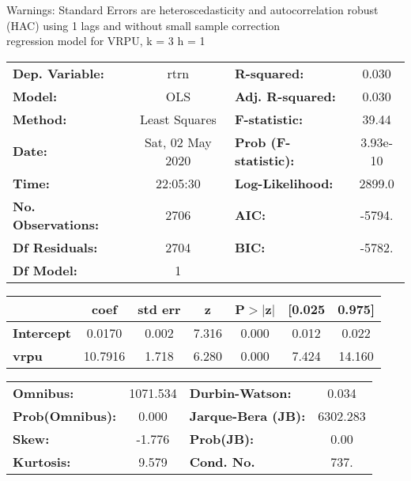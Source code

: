 Warnings: \newline
 [1] Standard Errors are heteroscedasticity and autocorrelation robust (HAC) using 1 lags and without small sample correction\\ 

regression model for VRPU, k = 3 h = 1\begin{center}
\begin{tabular}{lclc}
\toprule
\textbf{Dep. Variable:}    &       rtrn       & \textbf{  R-squared:         } &     0.030   \\
\textbf{Model:}            &       OLS        & \textbf{  Adj. R-squared:    } &     0.030   \\
\textbf{Method:}           &  Least Squares   & \textbf{  F-statistic:       } &     39.44   \\
\textbf{Date:}             & Sat, 02 May 2020 & \textbf{  Prob (F-statistic):} &  3.93e-10   \\
\textbf{Time:}             &     22:05:30     & \textbf{  Log-Likelihood:    } &    2899.0   \\
\textbf{No. Observations:} &        2706      & \textbf{  AIC:               } &    -5794.   \\
\textbf{Df Residuals:}     &        2704      & \textbf{  BIC:               } &    -5782.   \\
\textbf{Df Model:}         &           1      & \textbf{                     } &             \\
\bottomrule
\end{tabular}
\begin{tabular}{lcccccc}
                   & \textbf{coef} & \textbf{std err} & \textbf{z} & \textbf{P$> |$z$|$} & \textbf{[0.025} & \textbf{0.975]}  \\
\midrule
\textbf{Intercept} &       0.0170  &        0.002     &     7.316  &         0.000        &        0.012    &        0.022     \\
\textbf{vrpu}      &      10.7916  &        1.718     &     6.280  &         0.000        &        7.424    &       14.160     \\
\bottomrule
\end{tabular}
\begin{tabular}{lclc}
\textbf{Omnibus:}       & 1071.534 & \textbf{  Durbin-Watson:     } &    0.034  \\
\textbf{Prob(Omnibus):} &   0.000  & \textbf{  Jarque-Bera (JB):  } & 6302.283  \\
\textbf{Skew:}          &  -1.776  & \textbf{  Prob(JB):          } &     0.00  \\
\textbf{Kurtosis:}      &   9.579  & \textbf{  Cond. No.          } &     737.  \\
\bottomrule
\end{tabular}
\end{center}

